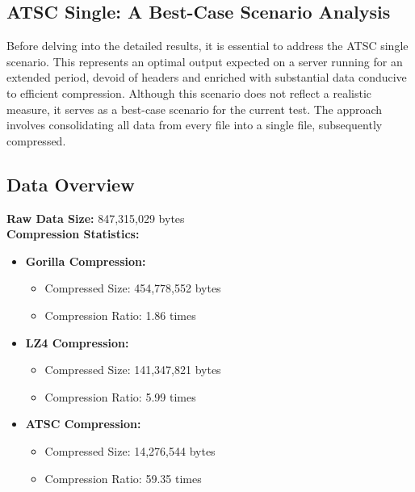 \documentclass[conference]{IEEEtran}
\begin{document}
\subsection*{ATSC Single: A Best-Case Scenario Analysis}

Before delving into the detailed results, it is essential to address the ATSC single scenario. This represents an optimal output expected on a server running for an extended period, devoid of headers and enriched with substantial data conducive to efficient compression. Although this scenario does not reflect a realistic measure, it serves as a best-case scenario for the current test. The approach involves consolidating all data from every file into a single file, subsequently compressed.

\subsection*{Data Overview}

\textbf{Raw Data Size:} 847,315,029 bytes \\
\textbf{Compression Statistics:}

\begin{itemize}
    \item \textbf{Gorilla Compression:}
    \begin{itemize}
        \item Compressed Size: 454,778,552 bytes
        \item Compression Ratio: 1.86 times
    \end{itemize}
    \item \textbf{LZ4 Compression:}
    \begin{itemize}
        \item Compressed Size: 141,347,821 bytes
        \item Compression Ratio: 5.99 times
    \end{itemize}
    \item \textbf{ATSC Compression:}
    \begin{itemize}
        \item Compressed Size: 14,276,544 bytes
        \item Compression Ratio: 59.35 times
    \end{itemize}
\end{itemize}


\end{document}
